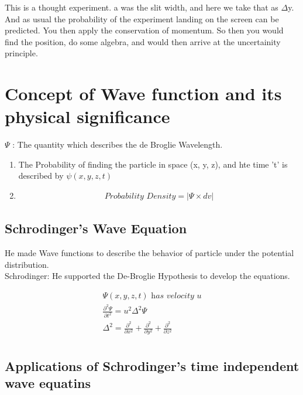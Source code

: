 \documentclass[11pt]{article}
\begin{document}
This is a thought experiment. a was the slit width, and here we take that as $\Delta$y. And as usual the probability of the experiment landing on the screen can be predicted. You then apply the conservation of momentum. So then you would find the position, do some algebra, and would then arrive at the uncertainity principle. 


\section{Concept of Wave function and its physical significance}

$\Psi$ : The quantity which describes the de Broglie Wavelength. 
\begin{enumerate}
	\item The Probability of finding the particle in space (x, y, z), and hte time 't' is described by $\psi (x, y, z, t)$
	\item
	 \begin{eqnarray}
	 	\textit{Probability Density} = |\Psi \times dv|
	\end{eqnarray}
	
\end{enumerate}
\subsection{Schrodinger's Wave Equation}

He made Wave functions to describe the behavior of particle under the potential distribution. \\
Schrodinger: He supported the De-Broglie Hypothesis to develop the equations. 


\begin{eqnarray}
	\Psi(x, y, z, t) \textit{ has velocity u}\\
	\frac{\partial^2 \Psi}{\partial t^2} = u^2\Delta^2 \Psi\\
	\Delta^2 = \frac{\partial^2}{\partial x^2} + \frac{\partial^2}{\partial y^2} + \frac{\partial^2}{\partial z^2}\\
\end{eqnarray}

\subsection{Applications of Schrodinger's time independent wave equatins}
\end{document}
